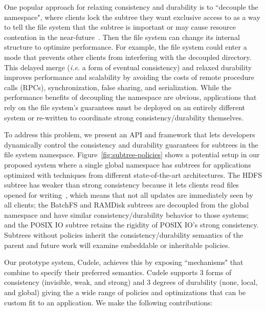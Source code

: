One popular approach for relaxing consistency and durability is to ``decouple
the namespace", where clients lock the subtree they want exclusive access to as
a way to tell the file system that the subtree is important or may cause
resource contention in the near-future~\cite{grider:pdsw2015-marfs,
zheng:pdsw2015-deltafs, zheng:pdsw2014-batchfs, ren:sc2014-indexfs,
bent:slides-twotiers}. Then the file system can change its internal structure
to optimize performance. For example, the file system could enter a mode that
prevents other clients from interfering with the decoupled directory.  This
delayed merge ({\it i.e.} a form of eventual consistency) and relaxed
durability improves performance and scalability by avoiding the costs of remote
procedure calls (RPCs), synchronization, false sharing, and serialization.
While the performance benefits of decoupling the namespace are obvious,
applications that rely on the file system's guarantees must be deployed on an
entirely different system or re-written to coordinate strong
consistency/durability themselves.

To address this problem, we present an API and framework that lets developers
dynamically control the consistency and durability guarantees for subtrees in
the file system namespace.  Figure~\ref{fig:subtree-policies} shows a potential
setup in our proposed system where a single global namespace has subtrees for
applications optimized with techniques from different state-of-the-art
architectures.  The HDFS subtree has weaker than strong consistency because it
lets clients read files opened for
writing~\cite{hakimzadeh:dais14-hdfs-consistency}, which means that not all
updates are immediately seen by all clients; the BatchFS and RAMDisk subtrees
are decoupled from the global namespace and have similar consistency/durability
behavior to those systems; and the POSIX IO subtree retains the rigidity of
POSIX IO's strong consistency.  Subtrees without policies inherit the
consistency/durability semantics of the parent and future work will examine
embeddable or inheritable policies.

Our prototype system, Cudele, achieves this by exposing ``mechanisms" that
 combine to specify their
preferred semantics.  Cudele supports 3 forms of consistency (invisible, weak,
and strong) and 3 degrees of durability (none, local, and global) giving the
 a wide range of policies and
optimizations that can be custom fit to an application. We make the following
contributions:


